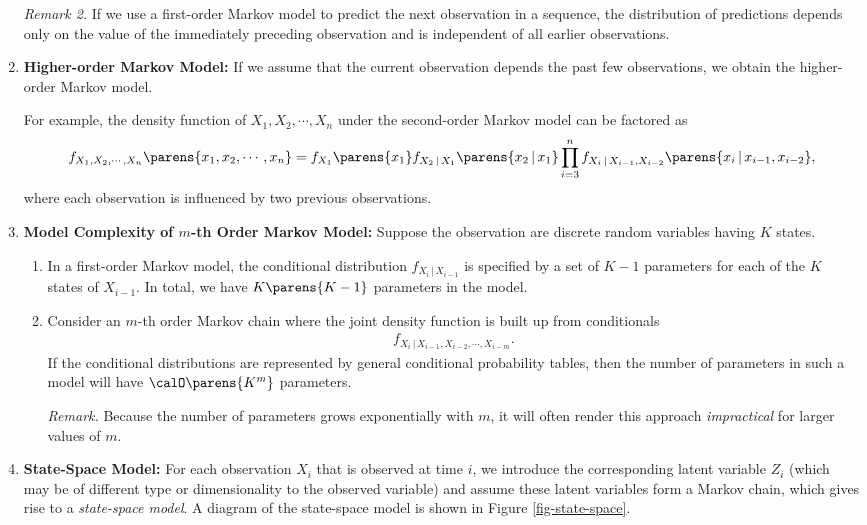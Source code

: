 \documentclass[12pt]{article}
\begin{document}
\begin{enumerate}[label=\textbf{\arabic*.}]
	\textit{Remark 2.} If we use a first-order Markov model to predict the next observation in a sequence, the distribution of predictions depends only on the value of the immediately preceding observation and is independent of all earlier observations. 
	
	\item \textbf{Higher-order Markov Model:} If we assume that the current observation depends the past few observations, we obtain the higher-order Markov model. 
	
	For example, the density function of $X_1, X_2, \cdots, X_n$ under the second-order Markov model can be factored as 
	\begin{align*}
		f_{X_1, X_2, \cdots, X_n} \parens{x_1, x_2, \cdots, x_n} = f_{X_1} \parens{x_1} f_{X_2 \,\vert\, X_1} \parens{x_2 \,\vert\, x_1} \prod_{i=3}^n f_{X_{i} \,\vert\, X_{i-1}, X_{i-2}} \parens{x_i \,\vert\, x_{i-1}, x_{i-2}}, 
	\end{align*}
	where each observation is influenced by two previous observations. 
	
	\item \textbf{Model Complexity of $m$-th Order Markov Model:} Suppose the observation are discrete random variables having $K$ states. 
	\begin{enumerate}
		\item In a first-order Markov model, the conditional distribution $f_{X_i \,\vert\, X_{i-1}}$ is specified by a set of $K - 1$ parameters for each of the $K$ states of $X_{i-1}$. In total, we have $K \parens{K - 1}$ parameters in the model. 
		
		\item Consider an $m$-th order Markov chain where the joint density function is built up from conditionals 
		\begin{align*}
			f_{X_i \,\vert\, X_{i-1}, X_{i-2}, \cdots, X_{i-m}}. 
		\end{align*}
		If the conditional distributions are represented by general conditional probability tables, then the number of parameters in such a model will have $\calO \parens{K^{m}}$ parameters. 
		
		\textit{Remark.} Because the number of parameters grows exponentially with $m$, it will often render this approach \emph{impractical} for larger values of $m$. 
	\end{enumerate}
	
	\item \textbf{State-Space Model:} For each observation $X_i$ that is observed at time $i$, we introduce the corresponding latent variable $Z_i$ (which may be of different type or dimensionality to the observed variable) and assume these latent variables form a Markov chain, which gives rise to a \emph{state-space model}. A diagram of the state-space model is shown in Figure \ref{fig-state-space}. 
	

\end{enumerate}
\end{document}
